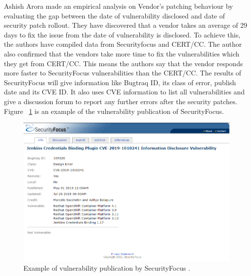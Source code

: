 Ashish Arora \cite{AsRaRaYu2006} made an empirical analysis on Vendor’s patching behaviour by evaluating the gap between the date of vulnerability disclosed and date of security patch rollout. They have discovered that a vendor takes an average of 29 days to fix the issue from the date of vulnerability is disclosed. To achieve this, the authors have compiled data from Securityfocus and CERT/CC. The author also confirmed that the vendors take more time to fix the vulnerabilities which they get from CERT/CC. This means the authors say that the vendor responds more faster to SecurityFocus vulnerabilities than the CERT/CC. The results of SecurityFocus will give information like Bugtraq ID, its class of error, publish date and its \acs{CVE} ID. It also uses \acs{CVE} information to list all vulnerabilities and give a discussion forum to report any further errors after the security patches. Figure ~\ref{fig:securityFocus} is an example of the vulnerability publication of SecurityFocus.
\newpage
\begin{figure}[h!]
	\includegraphics[width=15cm]{includes/securityFocus.png}
	\centering
	\caption{Example of vulnerability publication by SecurityFocus \cite{SecurityFocus}.}
	\label{fig:securityFocus}
\end{figure}

